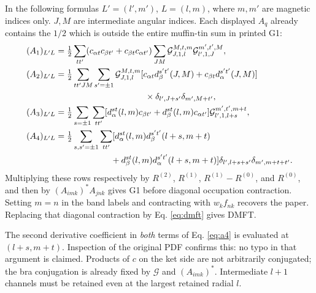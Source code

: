 \documentclass[11pt]{article}
\begin{document}
In the following formulas $L'=(l',m')$, $L=(l,m)$, where $m,m'$ are magnetic indices only. $J,M$ are intermediate angular indices. Each displayed $A_q$ already contains the $1/2$ which is outside the entire muffin-tin sum in printed G1:
\begin{align}
 (A_1)_{L'L}={}&\tfrac12\sum_{tt'}(c_{\alpha t}c_{\beta t'}+c_{\beta t}c_{\alpha t'})
 \sum_{JM}\mathcal G^{M,t,m}_{J,1,l}\mathcal G^{m',t',M}_{l',1,J},\label{eq:a1}\\*
 (A_2)_{L'L}={}&\tfrac12\sum_{tt'JM}\sum_{s'=\pm1}\mathcal G^{M,t,m}_{J,1,l}
 [c_{\alpha t}d_\beta^{s't'}(J,M)+c_{\beta t}d_\alpha^{s't'}(J,M)]\nonumber\\*
 &\hspace{32mm}\times\delta_{l',J+s'}\delta_{m',M+t'},\label{eq:a2}\\*
 (A_3)_{L'L}={}&\tfrac12\sum_{s=\pm1}\sum_{tt'}
 [d_\alpha^{st}(l,m)c_{\beta t'}+d_\beta^{st}(l,m)c_{\alpha t'}]
 \mathcal G^{m',t',m+t}_{l',1,l+s},\label{eq:a3}\\*
 (A_4)_{L'L}={}&\tfrac12\sum_{s,s'=\pm1}\sum_{tt'}
 [d_\alpha^{st}(l,m)d_\beta^{s't'}(l+s,m+t)\nonumber\\*
 &\hspace{18mm}+d_\beta^{st}(l,m)d_\alpha^{s't'}(l+s,m+t)]
 \delta_{l',l+s+s'}\delta_{m',m+t+t'}.\label{eq:a4}
\end{align}
Multiplying these rows respectively by $R^{(2)}$, $R^{(1)}$, $R^{(1)}-R^{(0)}$, and $R^{(0)}$, and then by $(A_{imk})^*A_{jnk}$ gives G1 before diagonal occupation contraction. Setting $m=n$ in the band labels and contracting with $w_k f_{nk}$ recovers the paper. Replacing that diagonal contraction by Eq. \eqref{eq:dmft} gives DMFT.

The second derivative coefficient in \emph{both} terms of Eq. \eqref{eq:a4} is evaluated at $(l+s,m+t)$. Inspection of the original PDF confirms this: no typo in that argument is claimed. Products of $c$ on the ket side are not arbitrarily conjugated; the bra conjugation is already fixed by $\mathcal G$ and $(A_{imk})^*$. Intermediate $l+1$ channels must be retained even at the largest retained radial $l$.
\end{document}
